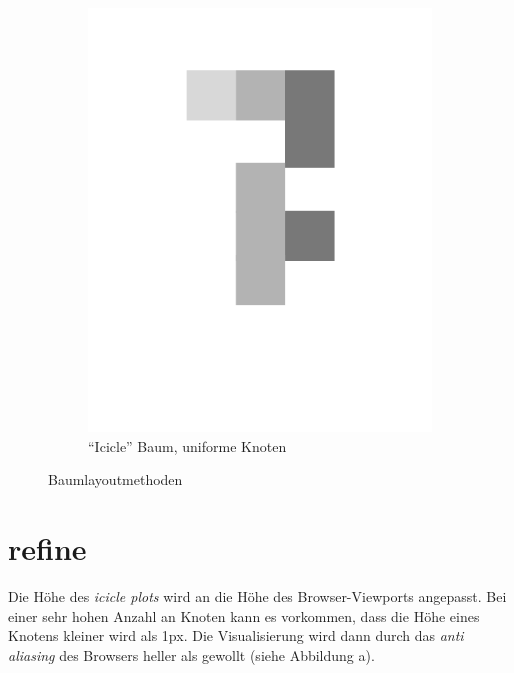 \documentclass[nobib, nohyper, a4paper,openany]{tufte-book}
\begin{document}
\begin{figure}
\begin{subfigure}[b]{0.3\textwidth}
    \includegraphics[width=\textwidth]{figures/tree_display3.pdf} 
    \caption{ ``Icicle'' Baum, uniforme Knoten}  
    \label{fig:treesc}   
  \end{subfigure}
  \caption{Baumlayoutmethoden}
  \label{fig:trees}
\end{figure}

\section{refine}
Die Höhe des \emph{icicle plots} wird an die Höhe des Browser-Viewports angepasst.
Bei einer sehr hohen Anzahl an Knoten kann es vorkommen, dass die Höhe eines Knotens kleiner wird als 1px. 
Die Visualisierung wird dann durch das \emph{anti aliasing} des Browsers heller als gewollt (siehe Abbildung a).
\end{document}
